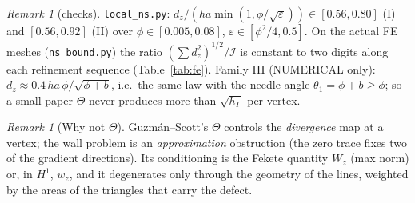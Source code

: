 \documentclass[11pt]{article}
\theoremstyle{remark}
\newtheorem{remark}[theorem]{Remark}
\newcommand{\hG}{h_\Gamma}
\begin{document}
\begin{remark}[checks]
\texttt{local\_ns.py}: $d_z/(h a\min(1,\phi/\sqrt\varepsilon))\in[0.56,0.80]$ (I) and $[0.56,0.92]$ (II) over
$\phi\in[0.005,0.08]$, $\varepsilon\in[\phi^2/4,0.5]$. On the actual FE meshes (\texttt{ns\_bound.py}) the ratio
$(\sum d_z^2)^{1/2}/\mathcal I$ is constant to two digits along each refinement sequence (Table~\ref{tab:fe}).
Family III (NUMERICAL only): $d_z\approx0.4\,h a\,\phi/\sqrt{\phi+b}$, i.e.\ the same law with the needle angle
$\theta_1=\phi+b\ge\phi$; so a small paper-$\Theta$ never produces more than $\sqrt{\hG}$ per vertex.
\end{remark}
\begin{remark}[Why not $\Theta$]
Guzm\'an--Scott's $\Theta$ controls the \emph{divergence} map at a vertex; the wall problem is an \emph{approximation} obstruction
(the zero trace fixes two of the gradient directions). Its conditioning is the Fekete quantity $W_z$ (max norm) or, in
$H^1$, $w_z$, and it degenerates only through the geometry of the lines, weighted by the areas of the triangles that
carry the defect.
\end{remark}
\end{document}
